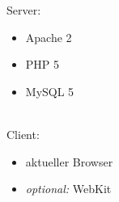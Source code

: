 Server:
\begin{itemize}
	\item Apache 2
	\item PHP 5
	\item MySQL 5
\end{itemize}
\\
Client: 
\begin{itemize}
	\item aktueller Browser
    \item \textit{optional:} WebKit
\end{itemize}